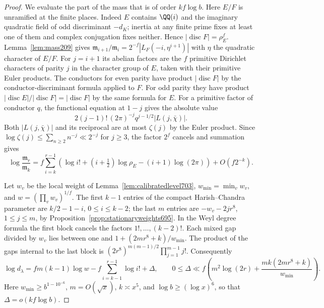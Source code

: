 \documentclass[a4paper,11pt]{article}
\theoremstyle{definition}
\theoremstyle{remark}
\numberwithin{equation}{section}
\begin{document}
\begin{proof}
We evaluate the part of the mass that is of order \(kf\log b\).
Here \(E/F\) is unramified at the finite places. Indeed \(E\)
contains \(\QQ(i)\) and the imaginary quadratic field of odd
discriminant \(-d_K\); inertia at any finite prime fixes at least
one of them and complex conjugation fixes neither. Hence
\(|\operatorname{disc}F|=\rho_E^f\).
Lemma~\ref{lem:mass209} gives
\(\mathfrak m_{i+1}/\mathfrak m_i=2^{-f}|L_F(-i,\eta^{i+1})|\)
with \(\eta\) the quadratic character of \(E/F\).
For \(j=i+1\) its abelian factors are the \(f\) primitive
Dirichlet characters of parity \(j\) in the character group of
\(E\), taken with their primitive Euler products. The conductors
for even parity have product \(|\operatorname{disc}F|\)
by the conductor-discriminant formula applied to \(F\).
For odd parity they have product
\(|\operatorname{disc}E|/|\operatorname{disc}F|
=|\operatorname{disc}F|\) by the same formula for \(E\).
For a primitive factor of conductor \(q\), the functional
equation at \(1-j\) gives the absolute value
\[
   2(j-1)!\,(2\pi)^{-j}q^{j-1/2}|L(j,\bar\chi)|.
\]
Both \(|L(j,\bar\chi)|\) and its reciprocal are at most
\(\zeta(j)\) by the Euler product. Since
\(\log\zeta(j)\le\sum_{n\ge2}n^{-j}\ll 2^{-j}\) for \(j\ge3\),
the factor \(2^f\) cancels and summation gives
\begin{equation}
 \log\frac{\mathfrak m_r}{\mathfrak m_k}
 = f\sum_{i=k}^{r-1}
 \left(\log i!+(i+\tfrac12)\log\rho_E-(i+1)\log(2\pi)\right)
       +O(f2^{-k}).
 \label{eq:massgamma869}
\end{equation}

Let \(w_v\) be the local weight of Lemma~\ref{lem:calibratedlevel703},
\(w_{\min}=\min_v w_v\), and \(w=(\prod_v w_v)^{1/f}\).
The first \(k-1\) entries of the compact Harish--Chandra parameter
are \(k/2-1-i\), \(0\le i\le k-2\); the last \(m\) entries are
\(-w_v-2jr^8\), \(1\le j\le m\), by
Proposition~\ref{prop:stationaryweights695}. In the Weyl degree
formula the first block cancels the factors \(1!,\ldots,(k-2)!\).
Each mixed gap divided by \(w_v\) lies between one and
\(1+(2mr^8+k)/w_{\min}\). The product of the gaps internal
to the last block is
\((2r^8)^{m(m-1)/2}\prod_{j=1}^{m-1}j!\).
Consequently
\[
 \log d_\lambda=fm(k-1)\log w-f\sum_{i=k-1}^{r-1}\log i!
             +\Delta,\qquad
 0\le\Delta\ll f\left(m^2\log(2r)
             +\frac{mk(2mr^8+k)}{w_{\min}}\right).
\]
Here \(w_{\min}\ge b^{1-10^{-6}}\), \(m=O(\sqrt{x})\),
\(k\asymp x^5\), and \(\log b\ge(\log x)^6\), so that
\(\Delta=o(kf\log b)\).


\end{proof}
\end{document}
